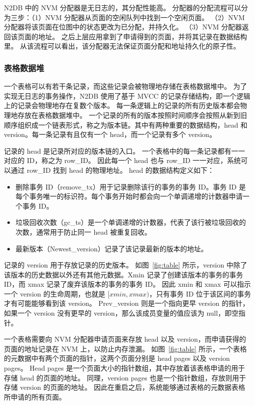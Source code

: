N2DB 中的 NVM 分配器是无日志的，其分配性能高。
分配器的分配流程可以分为三步：（1）NVM 分配器从页面的空闲队列中找到一个空闲页面。
（2）NVM 分配器将该页面在位图中的状态更改为已分配，并持久化。
（3）NVM 分配器返回该页面的地址。
之后上层应用拿到了申请得到的页面，并将其记录在数据结构里。
从该流程可以看出，该分配器无法保证页面分配和地址持久化的原子性。

\subsubsection{表格数据堆}

一个表格可以有若干条记录，而这些记录会被物理地存储在表格数据堆中。
为了实现无日志的事务操作，N2DB 使用了基于 MVCC 的记录存储结构，即一个逻辑上的记录会物理地存在复数个版本。
每一条逻辑上的记录的所有历史版本都会物理地存放在表格数据堆中。
一个记录的所有的版本按照时间顺序会按照从新到旧顺序组织成一个链表形式，称之为版本链。其中有两种重要的数据结构，head 和 version。每一条记录有且仅有一个 head，而一个记录有多个 version。

记录的 head 是记录所对应的版本链的入口。
一个表格中的每一条记录都有一一对应的 ID，称之为 row\_ID。
因此每一个 head 也与 row\_ID 一一对应，系统可以通过 row\_ID 找到 head 的物理地址。
head 的数据结构定义如下：
\begin{itemize}
    \item 删除事务 ID（remove\_tx）用于记录删除该行的事务的事务 ID。事务 ID 是每个事务唯一的标识符。每个事务开始时都会向一个单调递增的计数器申请一个事务 ID。
    \item 垃圾回收次数（gc\_ts）是一个单调递增的计数器，代表了该行被垃圾回收的次数，通常用于防止同一 head 被重复回收。
    \item 最新版本（Newest\_version）记录了该记录最新的版本的地址。
\end{itemize}

记录的 version 用于存放记录的历史版本。
如图~\ref{fig:table} 所示，version 中除了该版本的历史数据以外还有其他元数据。Xmin 记录了创建该版本的事务的事务 ID，而 xmax 记录了废弃该版本的事务的事务 ID。
因此 xmin 和 xmax 可以指示一个 version 的生命周期，也就是 $[xmin, xmax)$，只有事务 ID 位于该区间的事务才有可能能够看到该 version。
Prev\_version 则是一个指向更早 version 的指针，如果一个 version 没有更早的 version，那么该成员变量的值应该为 null，即空指针。

一个表格需要向 NVM 分配器申请页面来存放 head 以及 version，而申请获得的页面的地址记录在 NVM 上，以防止内存泄漏。
如图~\ref{fig:table} 所示，一个表格的元数据中有两个页面的指针，这两个页面分别是 head pages 以及 version pages。
Head pages 是一个页面大小的指针数组，其中存放着该表格申请的用于存储 head 的页面的地址。
同理，version pages 也是一个指针数组，存放则用于存储 version 的页面的地址。
因此在重启之后，系统能够通过表格的元数据表格所申请的所有页面。

